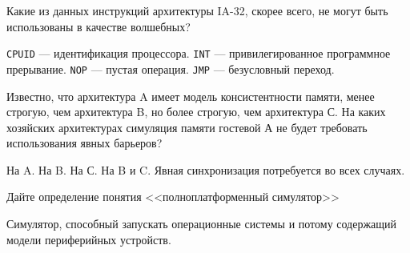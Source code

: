 \documentclass[a4paper, addpoints, answers]{exam}
\begin{document}
\begin{questions}


\question[1] Какие из данных инструкций архитектуры IA-32, скорее всего, не могут быть использованы в качестве волшебных?
\begin{choices}
	\choice \texttt{CPUID} --- идентификация процессора.
	\correctchoice \texttt{INT} --- привилегированное программное прерывание.
	\choice \texttt{NOP} --- пустая операция.
	\correctchoice \texttt{JMP} --- безусловный переход.
\end{choices}


\question[1] Известно, что архитектура A имеет модель консистентности памяти, менее строгую, чем архитектура B, но более строгую, чем архитектура С. На каких хозяйских архитектурах симуляция памяти гостевой А не будет требовать использования явных барьеров?
\begin{choices}
    \correctchoice На A.
    \correctchoice На B.
    \choice На С.
    \choice На B и C.
    \choice Явная синхронизация потребуется во всех случаях.
\end{choices}




\question[3] Дайте определение понятия <<полноплатформенный симулятор>>
\begin{solution}[2cm]
Симулятор,  способный запускать операционные системы и потому содержащий модели периферийных устройств.
\end{solution}



\end{questions}
\end{document}
